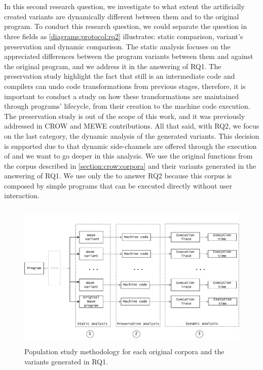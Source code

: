 
\section{\rqtwo}
\label{rq2:method}

In this second research question, we investigate to what extent the artificially created variants are dynamically different between them and to the original program. To conduct this research question, we could separate the question in three fields as \autoref{diagrams:protocol:rq2} illustrates: static comparison, variant's preservation and  dynamic comparison. %
The static analysis focuses on the appreciated differences between the program variants between them and against the original program, and we address it in the answering of RQ1. The preservation study highlight the fact that \wasm still is an intermediate code and compilers can undo code transformations from previous stages, therefore, it is important to conduct a study on how these transformations are maintained through \wasm programs' lifecycle, from their creation to the machine code execution. The preservation study is out of the scope of this work, and it was previously addressed in CROW and MEWE contributions.
All that said, with RQ2, we focus on the last category, the dynamic analysis of the generated variants. This decision is supported due to that dynamic side-channels are offered through the execution of \wasm and we want to go deeper in this analysis.
We use the original functions from the \corpusrosetta corpus described in \autoref{section:crow:corpora} and their variants generated in the answering of RQ1. 
We use only the \corpusrosetta to answer RQ2 because this corpus is composed by simple programs that can be executed directly without user interaction.


\begin{figure}[h]
    \centering
    \includegraphics[height=2.8in]{diagrams/Rq2.pdf}
    \caption{Population study methodology for each original corpora and the variants generated in RQ1.}
    \label{diagrams:protocol:rq2}
\end{figure}

